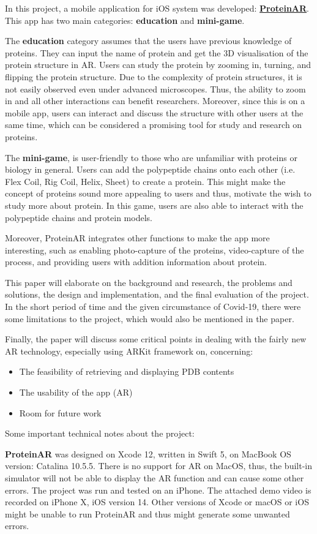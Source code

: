 In this project, a mobile application for iOS system was developed: \underline{\textbf{ProteinAR}}. This app has two main categories: \textbf{education} and \textbf{mini-game}. 

The \textbf{education} category assumes that the users have previous knowledge of proteins. They can input the name of protein and get the 3D visualisation of the protein structure in AR. Users can study the protein by zooming in, turning, and flipping the protein structure. Due to the complexity of protein structures, it is not easily observed even under advanced microscopes. Thus, the ability to zoom in and all other interactions can benefit researchers. Moreover, since this is on a mobile app, users can interact and discuss the structure with other users at the same time, which can be considered a promising tool for study and research on proteins.

The \textbf{mini-game}, is user-friendly to those who are unfamiliar with proteins or biology in general. Users can add the polypeptide chains onto each other (i.e. Flex Coil, Rig Coil, Helix, Sheet) to create a protein. This might make the concept of proteins sound more appealing to users and thus, motivate the wish to study more about protein. In this game, users are also able to interact with the polypeptide chains and protein models. 

Moreover, ProteinAR integrates other functions to make the app more interesting, such as enabling photo-capture of the proteins, video-capture of the process, and providing users with addition information about protein.

This paper will elaborate on the background and research, the problems and solutions, the design and implementation, and the final evaluation of the project. In the short period of time and the given circumstance of Covid-19, there were some limitations to the project, which would also be mentioned in the paper. 

Finally, the paper will discuss some critical points in dealing with the fairly new AR technology, especially using ARKit framework on, concerning:
\begin{itemize}
\item The feasibility of retrieving and displaying PDB contents
\item  The usability of the app (AR)
\item Room for future work
\end{itemize}

Some important technical notes about the project:

\textbf{ProteinAR} was designed on Xcode 12, written in Swift 5, on MacBook OS version: Catalina 10.5.5. There is no support for AR on MacOS, thus, the built-in simulator will not be able to display the AR function and can cause some other errors. The project was run and tested on an iPhone. The attached demo video is recorded on iPhone X, iOS version 14. Other versions of Xcode or macOS or iOS might be unable to run ProteinAR and thus might generate some unwanted errors. 

